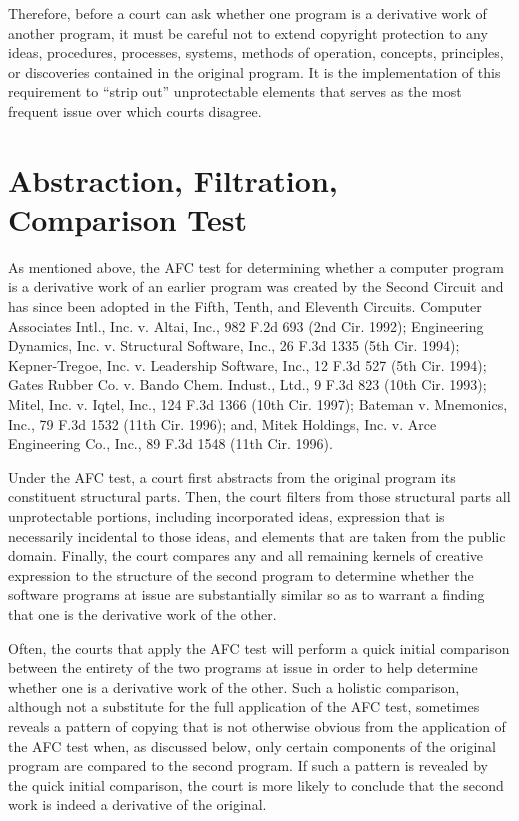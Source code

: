 Therefore, before a court can ask whether one program is a derivative work
of another program, it must be careful not to extend copyright protection
to any ideas, procedures, processes, systems, methods of operation,
concepts, principles, or discoveries contained in the original program. It
is the implementation of this requirement to ``strip out'' unprotectable
elements that serves as the most frequent issue over which courts
disagree.

\section{Abstraction, Filtration, Comparison Test}

As mentioned above, the AFC test for determining whether a computer
program is a derivative work of an earlier program was created by the
Second Circuit and has since been adopted in the Fifth, Tenth, and
Eleventh Circuits. Computer Associates Intl., Inc. v. Altai, Inc., 982
F.2d 693 (2nd Cir. 1992); Engineering Dynamics, Inc. v. Structural
Software, Inc., 26 F.3d 1335 (5th Cir. 1994); Kepner-Tregoe,
Inc. v. Leadership Software, Inc., 12 F.3d 527 (5th Cir. 1994); Gates
Rubber Co. v. Bando Chem. Indust., Ltd., 9 F.3d 823 (10th Cir. 1993);
Mitel, Inc. v. Iqtel, Inc., 124 F.3d 1366 (10th Cir. 1997); Bateman
v. Mnemonics, Inc., 79 F.3d 1532 (11th Cir. 1996); and, Mitek Holdings,
Inc. v. Arce Engineering Co., Inc., 89 F.3d 1548 (11th Cir. 1996).

Under the AFC test, a court first abstracts from the original program its
constituent structural parts. Then, the court filters from those
structural parts all unprotectable portions, including incorporated ideas,
expression that is necessarily incidental to those ideas, and elements
that are taken from the public domain. Finally, the court compares any and
all remaining kernels of creative expression to the structure of the
second program to determine whether the software programs at issue are
substantially similar so as to warrant a finding that one is the
derivative work of the other.

Often, the courts that apply the AFC test will perform a quick initial
comparison between the entirety of the two programs at issue in order to
help determine whether one is a derivative work of the other. Such a
holistic comparison, although not a substitute for the full application of
the AFC test, sometimes reveals a pattern of copying that is not otherwise
obvious from the application of the AFC test when, as discussed below,
only certain components of the original program are compared to the second
program. If such a pattern is revealed by the quick initial comparison,
the court is more likely to conclude that the second work is indeed a
derivative of the original.

